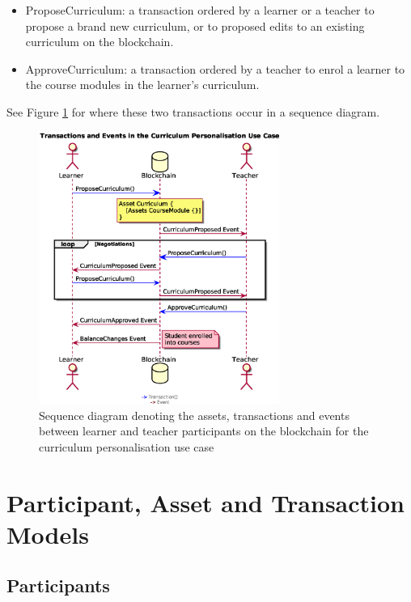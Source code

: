 \begin{itemize}
    \item ProposeCurriculum: a transaction ordered by a learner or a teacher to propose 
    a brand new curriculum, or to proposed edits to an existing curriculum on the blockchain.
    \item ApproveCurriculum: a transaction ordered by a teacher to enrol a learner to 
    the course modules in the learner's curriculum.
\end{itemize}

See Figure \ref{fig:personalisationloop} for where these two transactions occur in a sequence diagram.

\begin{figure}[!ht] 
    \centering    
    \includegraphics[width=0.7\textwidth]{personalisationloop}
    \caption[Curriculum Personalisation Use Case]
        {Sequence diagram denoting the assets, transactions and events between 
         learner and teacher participants on the blockchain for the curriculum personalisation use case} 
    \label{fig:personalisationloop}
\end{figure}



\section{Participant, Asset and Transaction Models}

\subsection{Participants}

